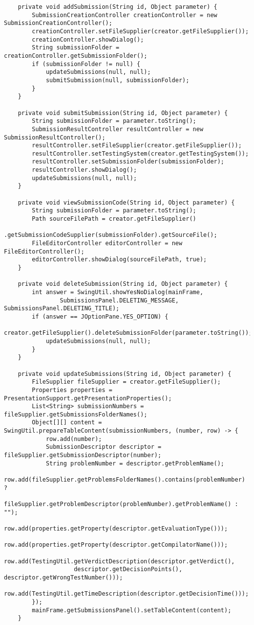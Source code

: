 \begin{verbatim}
    private void addSubmission(String id, Object parameter) {
        SubmissionCreationController creationController = new SubmissionCreationController();
        creationController.setFileSupplier(creator.getFileSupplier());
        creationController.showDialog();
        String submissionFolder = creationController.getSubmissionFolder();
        if (submissionFolder != null) {
            updateSubmissions(null, null);
            submitSubmission(null, submissionFolder);
        }
    }
    
    private void submitSubmission(String id, Object parameter) {
        String submissionFolder = parameter.toString();
        SubmissionResultController resultController = new SubmissionResultController();
        resultController.setFileSupplier(creator.getFileSupplier());
        resultController.setTestingSystem(creator.getTestingSystem());
        resultController.setSubmissionFolder(submissionFolder);
        resultController.showDialog();
        updateSubmissions(null, null);
    }
    
    private void viewSubmissionCode(String id, Object parameter) {
        String submissionFolder = parameter.toString();
        Path sourceFilePath = creator.getFileSupplier()
                .getSubmissionCodeSupplier(submissionFolder).getSourceFile();
        FileEditorController editorController = new FileEditorController();
        editorController.showDialog(sourceFilePath, true);
    }
    
    private void deleteSubmission(String id, Object parameter) {
        int answer = SwingUtil.showYesNoDialog(mainFrame,
                SubmissionsPanel.DELETING_MESSAGE, SubmissionsPanel.DELETING_TITLE);
        if (answer == JOptionPane.YES_OPTION) {
            creator.getFileSupplier().deleteSubmissionFolder(parameter.toString());
            updateSubmissions(null, null);
        }
    }
    
    private void updateSubmissions(String id, Object parameter) {
        FileSupplier fileSupplier = creator.getFileSupplier();
        Properties properties = PresentationSupport.getPresentationProperties();
        List<String> submissionNumbers = fileSupplier.getSubmissionsFolderNames();
        Object[][] content = SwingUtil.prepareTableContent(submissionNumbers, (number, row) -> {
            row.add(number);
            SubmissionDescriptor descriptor = fileSupplier.getSubmissionDescriptor(number);
            String problemNumber = descriptor.getProblemName();
            row.add(fileSupplier.getProblemsFolderNames().contains(problemNumber) ?
                    fileSupplier.getProblemDescriptor(problemNumber).getProblemName() : "");
            row.add(properties.getProperty(descriptor.getEvaluationType()));
            row.add(properties.getProperty(descriptor.getCompilatorName()));
            row.add(TestingUtil.getVerdictDescription(descriptor.getVerdict(),
                    descriptor.getDecisionPoints(), descriptor.getWrongTestNumber()));
            row.add(TestingUtil.getTimeDescription(descriptor.getDecisionTime()));
        });
        mainFrame.getSubmissionsPanel().setTableContent(content);
    }
    

\end{verbatim}
